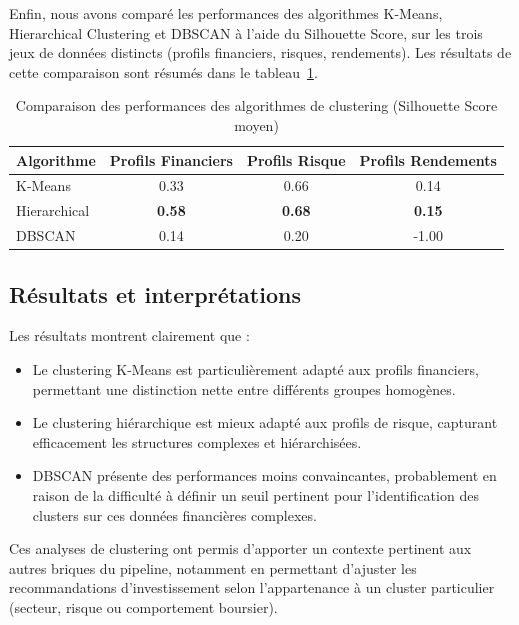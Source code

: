 \documentclass[a4paper,12pt]{article}
\begin{document}
Enfin, nous avons comparé les performances des algorithmes K-Means, Hierarchical Clustering et DBSCAN à l'aide du Silhouette Score, sur les trois jeux de données distincts (profils financiers, risques, rendements). Les résultats de cette comparaison sont résumés dans le tableau~\ref{tab:silhouette}.

\begin{table}[h!]
\centering
\begin{tabular}{|l|c|c|c|}
\hline
\textbf{Algorithme} & \textbf{Profils Financiers} & \textbf{Profils Risque} & \textbf{Profils Rendements}\\
\hline
K-Means & 0.33 & 0.66 & 0.14\\
Hierarchical & \textbf{0.58} & \textbf{0.68} & \textbf{0.15}\\
DBSCAN & 0.14 & 0.20 & -1.00\\
\hline
\end{tabular}
\caption{Comparaison des performances des algorithmes de clustering (Silhouette Score moyen)}
\label{tab:silhouette}
\end{table}

\subsection*{Résultats et interprétations}

Les résultats montrent clairement que :
\begin{itemize}
    \item Le clustering K-Means est particulièrement adapté aux profils financiers, permettant une distinction nette entre différents groupes homogènes.
    \item Le clustering hiérarchique est mieux adapté aux profils de risque, capturant efficacement les structures complexes et hiérarchisées.
    \item DBSCAN présente des performances moins convaincantes, probablement en raison de la difficulté à définir un seuil pertinent pour l’identification des clusters sur ces données financières complexes.
\end{itemize}

Ces analyses de clustering ont permis d’apporter un contexte pertinent aux autres briques du pipeline, notamment en permettant d'ajuster les recommandations d’investissement selon l’appartenance à un cluster particulier (secteur, risque ou comportement boursier).
\end{document}
